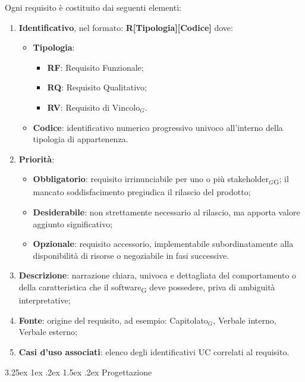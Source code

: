 \documentclass[a4paper, 10pt]{article}
\makeatletter
\renewcommand\paragraph{\@startsection{paragraph}{4}{\z@}%
  {3.25ex \@plus1ex \@minus .2ex}%
  {1.5ex \@plus .2ex}%
  {\normalfont\normalsize\bfseries}}
\makeatother
\begin{document}
Ogni requisito è costituito dai seguenti elementi:

\begin{enumerate}
    \item \textbf{Identificativo}, nel formato:
    \noindent\textbf{R[Tipologia][Codice]}
    dove:
    \begin{itemize}
        \item \textbf{Tipologia}:
        \begin{itemize}
            \item \textbf{RF}: Requisito Funzionale;
            \item \textbf{RQ}: Requisito Qualitativo;
            \item \textbf{RV}: Requisito di Vincolo$_G$.
        \end{itemize}
        \item \textbf{Codice}: identificativo numerico progressivo univoco all'interno della tipologia di appartenenza.
    \end{itemize}

    \item \textbf{Priorità}:
    \begin{itemize}
        \item \textbf{Obbligatorio}: requisito irrinunciabile per uno o più stakeholder$_G$\textsubscript{G}; il mancato soddisfacimento pregiudica il rilascio del prodotto;
        \item \textbf{Desiderabile}: non strettamente necessario al rilascio, ma apporta valore aggiunto significativo;
        \item \textbf{Opzionale}: requisito accessorio, implementabile subordinatamente alla disponibilità di risorse o negoziabile in fasi successive.
    \end{itemize}

    \item \textbf{Descrizione}: narrazione chiara, univoca e dettagliata del comportamento o della caratteristica che il software\textsubscript{G} deve possedere, priva di ambiguità interpretative;

    \item \textbf{Fonte}: origine del requisito, ad esempio: Capitolato$_G$, Verbale interno, Verbale esterno;

    \item \textbf{Casi d'uso associati}: elenco degli identificativi UC correlati al requisito.
\end{enumerate}

\paragraph{Progettazione}
\end{document}
